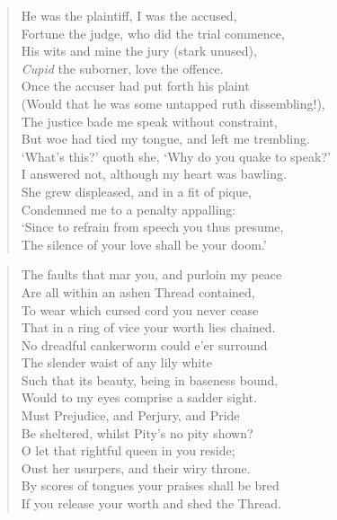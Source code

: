 \documentclass[b6paper, oneside]{memoir}
\begin{document}
\PoemTitle{}
\begin{verse}
    He was the plaintiff, I was the accused, \\
    Fortune the judge, who did the trial commence, \\
    His wits and mine the jury (stark unused), \\
    \textit{Cupid} the suborner, love the offence. \\
    Once the accuser had put forth his plaint \\
    (Would that he was some untapped ruth dissembling!), \\
    The justice bade me speak without constraint, \\
    But woe had tied my tongue, and left me trembling. \\
    `What's this?' quoth she, `Why do you quake to speak?' \\
    I answered not, although my heart was bawling. \\
    She grew displeased, and in a fit of pique, \\
    Condemned me to a penalty appalling: \\
    \vin `Since to refrain from speech you thus presume, \\
    \vin The silence of your love shall be your doom.'
\end{verse}

\PoemTitle{}
\begin{verse}
    The faults that mar you, and purloin my peace \\
    Are all within an ashen Thread contained, \\
    To wear which cursed cord you never cease \\
    That in a ring of vice your worth lies chained. \\
    No dreadful cankerworm could e'er surround \\
    The slender waist of any lily white \\
    Such that its beauty, being in baseness bound, \\
    Would to my eyes comprise a sadder sight. \\
    Must Prejudice, and Perjury, and Pride \\
    Be sheltered, whilst Pity's no pity shown? \\
    O let that rightful queen in you reside; \\
    Oust her usurpers, and their wiry throne. \\
    \vin By scores of tongues your praises shall be bred \\
    \vin If you release your worth and shed the Thread.
\end{verse}
\end{document}
